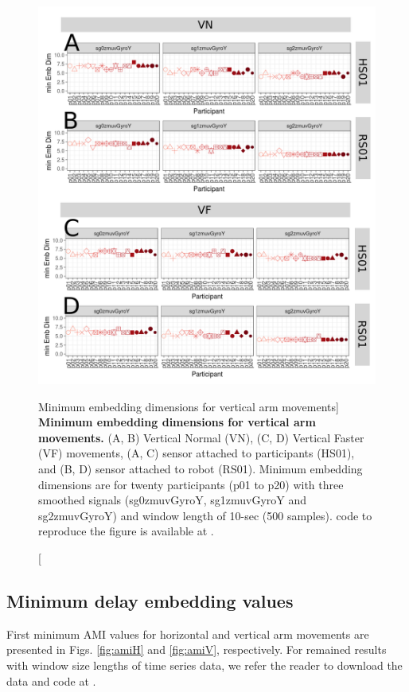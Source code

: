 \begin{figure}
\centering
\includegraphics[width=1.0\textwidth]{cao_aVw10}
	\caption
	[Minimum embedding dimensions for vertical arm movements]{
	{\bf Minimum embedding dimensions for vertical arm movements.} 
		(A, B) Vertical Normal (VN), (C, D) Vertical Faster (VF) 
		movements,
		(A, C) sensor attached to participants (HS01), and		
		(B, D) sensor attached to robot (RS01).
		Minimum embedding dimensions are for twenty participants 
		(p01 to p20) with three smoothed signals (sg0zmuvGyroY, 
		sg1zmuvGyroY and sg2zmuvGyroY) 
		and window length of 10-sec (500 samples).
	\R code to reproduce the figure is available at 
	.
        }
    \label{fig:caoV}
\end{figure}


\newpage
\subsection{Minimum delay embedding values}
First minimum AMI values for horizontal and vertical arm movements
are presented in Figs.  \ref{fig:amiH} and \ref{fig:amiV}, respectively.
For remained  results with window size lengths of time series data, we refer
the reader to download the data and code at \cite{xochicale2019}.

